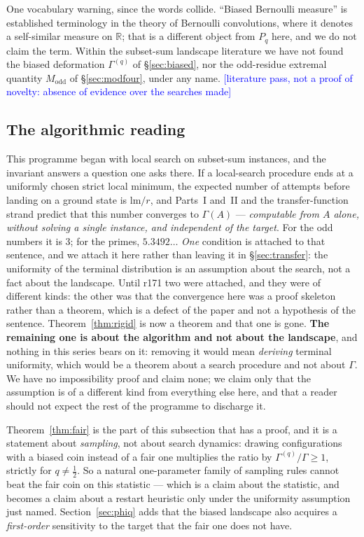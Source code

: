 \documentclass[11pt,a4paper]{article}
\theoremstyle{plain}
\theoremstyle{definition}
\theoremstyle{remark}
\newcommand{\lm}{\mathrm{lm}}
\newcommand{\STATUS}[1]{\textcolor{blue}{\textsf{[#1]}}}
\begin{document}
One vocabulary warning, since the words collide. ``Biased Bernoulli measure'' is established
terminology in the theory of Bernoulli convolutions, where it denotes a self-similar measure
on $\mathbb{R}$; that is a different object from $P_q$ here, and we do not claim the term.
Within the subset-sum landscape literature we have not found the biased deformation
$\Gamma^{(q)}$ of \S\ref{sec:biased}, nor the odd-residue extremal quantity
$M_{\mathrm{odd}}$ of \S\ref{sec:modfour}, under any name.
\STATUS{literature pass, not a proof of novelty: absence of evidence over the searches made}

\subsection{The algorithmic reading}

This programme began with local search on subset-sum instances, and the invariant answers a
question one asks there. If a local-search procedure ends at a uniformly chosen strict local
minimum, the expected number of attempts before landing on a ground state is $\lm/r$, and
Parts~I and~II and the transfer-function strand predict that this number converges to $\Gamma(A)$ --- \emph{computable from $A$
alone, without solving a single instance, and independent of the target}. For the odd numbers
it is $3$; for the primes, $5.3492\ldots$ \emph{One} condition is attached to that sentence,
and we attach it here rather than leaving it in \S\ref{sec:transfer}: the uniformity of the
terminal distribution is an assumption about the search, not a fact about the landscape. Until r171 two were attached, and they were of different kinds: the other was that the
convergence here was a proof skeleton rather than a theorem, which is a defect of the paper and
not a hypothesis of the sentence. Theorem~\ref{thm:rigid} is now a theorem and that one is
gone. \textbf{The remaining
one is about the algorithm and not about the landscape}, and nothing in this series bears on it:
removing it would mean \emph{deriving} terminal uniformity, which would be a theorem about a
search procedure and not about $\Gamma$. We have no impossibility proof and claim none; we claim
only that the assumption is of a different kind from everything else here, and that a reader
should not expect the rest of the programme to discharge it.

Theorem~\ref{thm:fair} is the part of this subsection that has a proof, and it is a statement
about \emph{sampling}, not about search dynamics: drawing configurations with a biased coin
instead of a fair one multiplies the ratio by $\Gamma^{(q)}/\Gamma\ge1$, strictly for
$q\ne\tfrac12$. So a natural one-parameter family of sampling rules cannot beat the fair coin
on this statistic --- which is a claim about the statistic, and becomes a claim about a
restart heuristic only under the uniformity assumption just named.
Section~\ref{sec:phiq} adds that the biased landscape also acquires a \emph{first-order}
sensitivity to the target that the fair one does not have.
\end{document}
